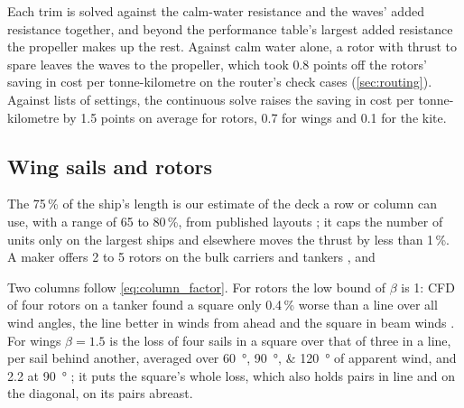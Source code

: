 Each trim is solved against the calm-water resistance and the waves' added resistance together, and beyond the performance table's largest added resistance the propeller makes up the rest. Against calm water alone, a rotor with thrust to spare leaves the waves to the propeller, which took 0.8 points off the rotors' saving in cost per tonne-kilometre on the router's check cases (\cref{sec:routing}). Against lists of settings, the continuous solve raises the saving in cost per tonne-kilometre by 1.5 points on average for rotors, 0.7 for wings and 0.1 for the kite.

\subsection{Wing sails and rotors}
\label{sec:det_deck}

The 75\,\% of the ship's length is our estimate of the deck a row or column can use, with a range of 65 to 80\,\%, from published layouts \citep{han2025,mboumba2022}; it caps the number of units only on the largest ships and elsewhere moves the thrust by less than 1\,\%. A maker offers 2 to 5 rotors on the bulk carriers and tankers \citep{anemoi2024brochure}, and 

Two columns follow \cref{eq:column_factor}. For rotors the low bound of $\beta$ is 1: CFD of four rotors on a tanker found a square only 0.4\,\% worse than a line over all wind angles, the line better in winds from ahead and the square in beam winds \citep{guzelbulut2024arrangement}. For wings $\beta=1.5$ is the loss of four sails in a square over that of three in a line, per sail behind another, averaged over \SIlist{60;90;120}{\degree} of apparent wind, and 2.2 at \SI{90}{\degree} \citep{vanreen2026}; it puts the square's whole loss, which also holds pairs in line and on the diagonal, on its pairs abreast.

